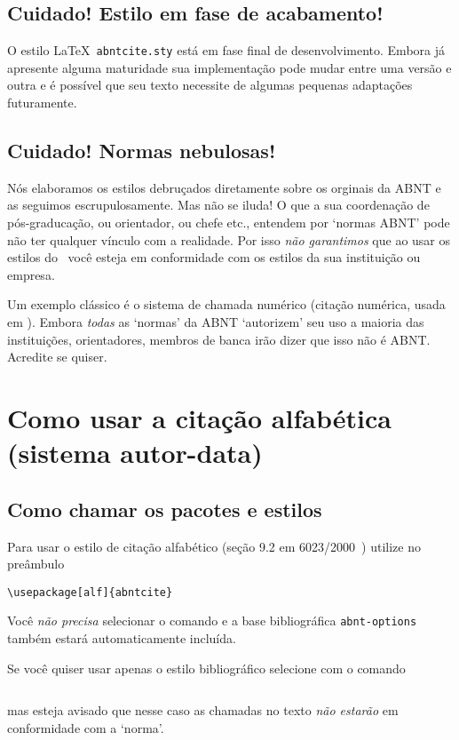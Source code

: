 \documentclass[espacosimples]{abnt}
\begin{document}
\section{Cuidado! Estilo em fase de acabamento!}

O estilo \LaTeX\ {\tt abntcite.sty} está em fase final de desenvolvimento.
Embora já apresente alguma maturidade sua implementação pode mudar entre
uma versão e outra e é possível que seu texto necessite de algumas
pequenas adaptações futuramente.

\section{Cuidado! Normas nebulosas!}

Nós elaboramos os estilos debruçados diretamente sobre os orginais da ABNT
e as seguimos escrupulosamente. Mas não se iluda! O que a sua coordenação
de pós-graducação, ou orientador, ou chefe etc., entendem por `normas ABNT'
pode não ter qualquer vínculo com a realidade. Por isso \emph{não garantimos}
que ao usar os estilos do \abnTeX\ você esteja em conformidade com os estilos
da sua instituição ou empresa.

Um exemplo clássico é o sistema de chamada numérico
(citação numérica, usada em \cite{abnt-bibtex-doc}).
Embora \emph{todas} as `normas' da ABNT \cite{NBR10520:1988,NBR6023:2000,NBR6023:2002,NBR10520:2001,NBR10520:2002}
`autorizem' seu uso a maioria das instituições, orientadores, membros de banca
irão dizer que isso não é ABNT. Acredite se quiser.

\chapter{Como usar a citação alfabética (sistema autor-data)}

\section{Como chamar os pacotes e estilos}

Para usar o estilo de citação alfabético
(seção 9.2 em 6023/2000~\cite{NBR6023:2000})
utilize no preâmbulo
\begin{verbatim}
\usepackage[alf]{abntcite}
\end{verbatim}
Você \emph{não precisa} selecionar o comando \verb++
e a base bibliográfica \verb+abnt-options+ também estará automaticamente
incluída.

Se você quiser usar apenas o estilo bibliográfico
selecione com o comando
\begin{verbatim}

\end{verbatim}
mas esteja avisado que nesse caso as chamadas no texto \emph{não estarão}
em conformidade com a `norma'.
\end{document}
